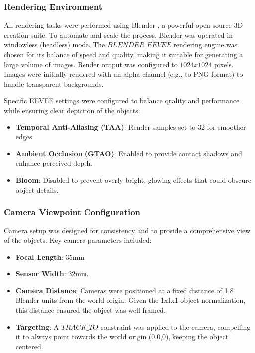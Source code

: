 \subsubsection{Rendering Environment}\label{sssec:rendering-environment}
All rendering tasks were performed using Blender \cite{blender}, a powerful open-source 3D creation suite. To automate and scale the process, Blender was operated in windowless (headless) mode. The $BLENDER\_EEVEE$ rendering engine was chosen for its balance of speed and quality, making it suitable for generating a large volume of images. Render output was configured to $1024x1024$ pixels. Images were initially rendered with an alpha channel (e.g., to PNG format) to handle transparent backgrounds.

Specific EEVEE settings were configured to balance quality and performance while ensuring clear depiction of the objects:
\begin{itemize}
  \item \textbf{Temporal Anti-Aliasing (TAA)}: Render samples set to 32 for smoother edges.
  \item \textbf{Ambient Occlusion (GTAO)}: Enabled to provide contact shadows and enhance perceived depth.
  \item \textbf{Bloom}: Disabled to prevent overly bright, glowing effects that could obscure object details.
\end{itemize}

\subsubsection{Camera Viewpoint Configuration}\label{sssec:camera-config}
Camera setup was designed for consistency and to provide a comprehensive view of the objects.
Key camera parameters included:
\begin{itemize}
  \item \textbf{Focal Length}: 35mm.
  \item \textbf{Sensor Width}: 32mm.
  \item \textbf{Camera Distance}: Cameras were positioned at a fixed distance of 1.8 Blender units from the world origin. Given the 1x1x1 object normalization, this distance ensured the object was well-framed.
  \item \textbf{Targeting}: A $TRACK\_TO$ constraint was applied to the camera, compelling it to always point towards the world origin (0,0,0), keeping the object centered.
\end{itemize}

